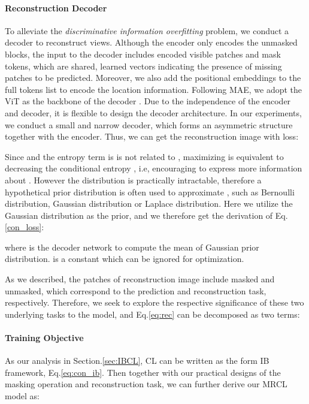 \documentclass[10pt,twocolumn,letterpaper]{article}
\begin{document}
\paragraph{Reconstruction Decoder}
To alleviate the \textit{discriminative information overfitting} problem, we conduct a decoder to reconstruct views. Although the encoder only encodes the unmasked blocks, the input to the decoder includes encoded visible patches and mask tokens, which are shared, learned vectors indicating the presence of missing patches to be predicted. Moreover, we also add the positional embeddings to the full tokens list to encode the location information. Following MAE, we adopt the ViT as the backbone of the decoder . Due to the independence of the encoder and decoder, it is flexible to design the decoder architecture. In our experiments, we conduct a small and narrow decoder, which forms an asymmetric structure together with the encoder.
Thus, we can get the reconstruction image  with loss:

Since  and the entropy term  is is not related to , maximizing  is equivalent to decreasing the conditional entropy , i.e, encouraging  to express more information about . However the distribution  is practically intractable, therefore a hypothetical prior distribution  is often used to approximate , such as Bernoulli distribution, Gaussian distribution or
Laplace distribution. Here we utilize the Gaussian distribution as the prior, and we therefore get the derivation of Eq.\eqref{con_loss}:

where  is the decoder network to compute the mean of Gaussian prior distribution.  is a constant which can be ignored for optimization.

As we described, the patches of reconstruction image  include masked and unmasked, which correspond to the prediction and reconstruction task, respectively. Therefore, we seek to explore the respective significance of these two underlying tasks to the model, and Eq.\eqref{eq:rec} can be decomposed as two terms:


\paragraph{Training Objective}
As our analysis in Section.\ref{sec:IBCL}, CL can be written as the form IB framework, Eq.\eqref{eq:con_ib}. Then together with our practical designs of the masking operation  and reconstruction task, we can further derive our MRCL model as:
\end{document}
